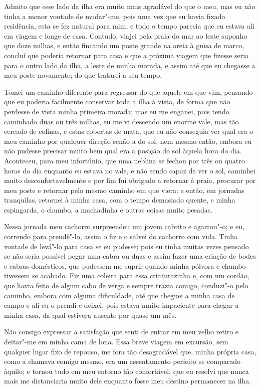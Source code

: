 Admito que esse lado da ilha era muito mais agradável do que o meu, mas
eu não tinha a menor vontade de mudar"-me, pois uma vez que eu havia
fixado residência, esta se fez natural para mim, e todo o tempo parecia
que eu estava ali em viagem e longe de casa. Contudo, viajei pela praia
do mar ao leste suponho que doze milhas, e então fincando um poste
grande na areia à guisa de marco, concluí que poderia retornar para casa
e que a próxima viagem que fizesse seria para o outro lado da ilha, a
leste de minha morada, e assim até que eu chegasse a meu poste
novamente; do que tratarei a seu tempo.

Tomei um caminho diferente para regressar do que aquele em que vim,
pensando que eu poderia facilmente conservar toda a ilha à vista, de
forma que não perdesse de vista minha primeira morada; mas eu me
enganei, pois tendo caminhado duas ou três milhas, eu me vi descendo um
enorme vale, mas tão cercado de colinas, e estas cobertas de mata, que
eu não conseguia ver qual era o meu caminho por qualquer direção senão a
do sol, nem mesmo então, embora eu não pudesse precisar muito bem qual
era a posição do sol àquela hora do dia. Aconteceu, para meu infortúnio,
que uma neblina se fechou por três ou quatro horas do dia enquanto eu
estava no vale, e não sendo capaz de ver o sol, caminhei muito
desconfortavelmente e por fim fui obrigado a retornar à praia, procurar
por meu poste e retornar pelo mesmo caminho em que viera: e então, em
jornadas tranquilas, retornei à minha casa, com o tempo demasiado
quente, e minha espingarda, o chumbo, a machadinha e outras coisas muito
pesadas.

Nessa jornada meu cachorro surpreendeu um jovem cabrito e agarrou"-o; e
eu, correndo para prendê"-lo, assim o fiz e o salvei do cachorro com
vida. Tinha vontade de levá"-lo para casa se eu pudesse; pois eu tinha
muitas vezes pensado se não seria possível pegar uma cabra ou duas e
assim fazer uma criação de bodes e cabras domésticos, que pudessem me
suprir quando minha pólvora e chumbo tivessem se acabado. Fiz uma
coleira para essa criaturazinha e, com um cordão, que havia feito de
algum cabo de verga e sempre trazia comigo, conduzi"-o pelo caminho,
embora com alguma dificuldade, até que cheguei a minha casa de campo e
ali eu o prendi e deixei, pois estava muito impaciente para chegar a
minha casa, da qual estivera ausente por quase um mês.

Não consigo expressar a satisfação que senti de entrar em meu velho
retiro e deitar"-me em minha cama de lona. Essa breve viagem em excursão,
sem qualquer lugar fixo de repouso, me fora tão desagradável que, minha
própria casa, como a chamava comigo mesmo, era um assentamento perfeito
se comparado àquilo; e tornou tudo em meu entorno tão confortável, que
eu resolvi que nunca mais me distanciaria muito dele enquanto fosse meu
destino permanecer na ilha.

